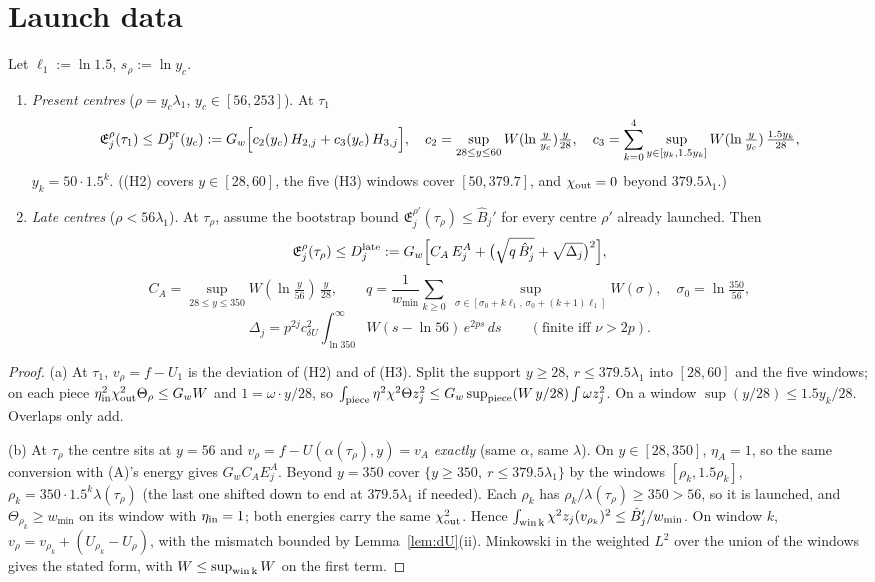 \documentclass[11pt]{article}
\theoremstyle{remark}\newtheorem{remark}[theorem]{Remark}
\newcommand{\E}{\mathfrak E}
\begin{document}
\section{Launch data}\label{sec:launch}
\begin{lemma}\label{lem:launch}
Let $\ell_1:=\ln1.5$, $s_\rho:=\ln y_c$.
\begin{enumerate}[label=(\alph*),leftmargin=*]
\item \emph{Present centres} ($\rho=y_c\lambda_1$, $y_c\in[56,253]$). At $\tau_1$
\[
\E^\rho_j(\tau_1)\le D_j^{\rm pr}(y_c):=G_w\Bigl[c_2(y_c)\,H_{2,j}+c_3(y_c)\,H_{3,j}\Bigr],\quad
c_2=\sup_{28\le y\le60}W(\ln\tfrac y{y_c})\tfrac y{28},\quad c_3=\sum_{k=0}^{4}\sup_{y\in[y_k,1.5y_k]}W(\ln\tfrac y{y_c})\,\tfrac{1.5y_k}{28},
\]
$y_k=50\cdot1.5^k$. ((H2) covers $y\in[28,60]$, the five (H3) windows cover $[50,379.7]$, and $\chi_{\rm out}=0$ beyond $379.5\lambda_1$.)
\item \emph{Late centres} ($\rho<56\lambda_1$). At $\tau_\rho$, assume the bootstrap bound $\E^{\rho'}_j(\tau_\rho)\le\hat B_j'$ for every centre $\rho'$ already launched. Then
\[
\E^\rho_j(\tau_\rho)\le D_j^{\rm late}:=G_w\Bigl[C_A\,E^A_j+\bigl(\sqrt{q\,\hat B_j'}+\sqrt{\Delta_j}\bigr)^2\Bigr],
\]
\[
C_A=\sup_{28\le y\le350}W(\ln\tfrac y{56})\,\tfrac y{28},\qquad q=\frac1{w_{\min}}\sum_{k\ge0}\ \sup_{\sigma\in[\sigma_0+k\ell_1,\,\sigma_0+(k+1)\ell_1]}W(\sigma),\quad\sigma_0=\ln\tfrac{350}{56},
\]
\[
\Delta_j=p^{2j}c_{\delta U}^2\int_{\ln350}^\infty W(s-\ln56)\,e^{2ps}\,ds\qquad(\text{finite iff }\nu>2p).
\]
\end{enumerate}
\end{lemma}
\begin{proof}
(a) At $\tau_1$, $v_\rho=f-U_1$ is the deviation of (H2) and of (H3). Split the support $y\ge28$, $r\le379.5\lambda_1$ into $[28,60]$ and the five windows; on each piece $\eta_{\rm in}^2\chi_{\rm out}^2\Theta_\rho\le G_wW$ and $1=\omega\cdot y/28$, so $\int_{\rm piece}\eta^2\chi^2\Theta z_j^2\le G_w\sup_{\rm piece}(W\,y/28)\int\omega z_j^2$. On a window $\sup(y/28)\le1.5y_k/28$. Overlaps only add.

(b) At $\tau_\rho$ the centre sits at $y=56$ and $v_\rho=f-U(\alpha(\tau_\rho),y)=v_A$ \emph{exactly} (same $\alpha$, same $\lambda$). On $y\in[28,350]$, $\eta_A=1$, so the same conversion with (A)'s energy gives $G_wC_AE^A_j$. Beyond $y=350$ cover $\{y\ge350,\ r\le379.5\lambda_1\}$ by the windows $[\rho_k,1.5\rho_k]$, $\rho_k=350\cdot1.5^k\lambda(\tau_\rho)$ (the last one shifted down to end at $379.5\lambda_1$ if needed). Each $\rho_k$ has $\rho_k/\lambda(\tau_\rho)\ge350>56$, so it is launched, and $\Theta_{\rho_k}\ge w_{\min}$ on its window with $\eta_{\rm in}=1$; both energies carry the same $\chi_{\rm out}^2$. Hence $\int_{\rm win\,k}\chi^2z_j(v_{\rho_k})^2\le\hat B_j'/w_{\min}$. On window $k$, $v_\rho=v_{\rho_k}+(U_{\rho_k}-U_\rho)$, with the mismatch bounded by Lemma~\ref{lem:dU}(ii). Minkowski in the weighted $L^2$ over the union of the windows gives the stated form, with $W\le\sup_{\rm win\,k}W$ on the first term.
\end{proof}
\end{document}
